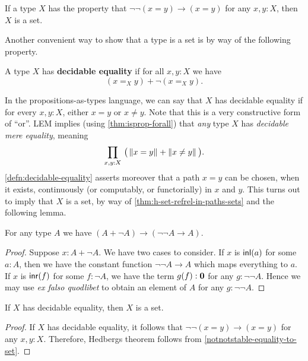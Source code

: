 \begin{cor}\label{notnotstable-equality-to-set}
  If a type $X$ has the property that $\neg\neg(x=y)\to(x=y)$ for any $x,y:X$, then $X$ is a set.
\end{cor}

Another convenient way to show that a type is a set is by way of the following property.

\begin{defn}\label{defn:decidable-equality}
 A type $X$ has \textbf{decidable equality} if for all $x, y : X$ we have
 \[(x =_X y) + \neg (x =_X y).\]
\end{defn}

In the propositions-as-types language, we can say that $X$ has decidable equality if for every $x,y:X$, either $x=y$ or $x\neq y$.
Note that this is a very constructive form of ``or''.
LEM implies (using \autoref{thm:isprop-forall}) that \emph{any} type $X$ has \emph{decidable mere equality}, meaning
\[\prd{x,y:X} \big(\brck{x=y} + \brck{x\neq y}\big).\]
\autoref{defn:decidable-equality} asserts moreover that a path $x=y$ can be chosen, when it exists, continuously (or computably, or
functorially) in $x$ and $y$.
This turns out to imply that $X$ is a set, by way of \autoref{thm:h-set-refrel-in-paths-sets} and the following lemma.

\begin{lem}
For any type $A$ we have $(A+\neg A)\to(\neg\neg A\to A)$.
\end{lem}

\begin{proof}
Suppose $x:A+\neg A$. We have two cases to consider.
If $x$ is ${\mathsf{inl}}(a)$ for some $a:A$, then we have the constant function $\neg\neg A
\to A$ which maps everything to $a$. If $x$ is ${\mathsf{inr}}(f)$ for some $f:\neg A$,
we have the term $g(f):\mathbf{0}$ for any $g:\neg\neg A$. Hence we may use
\textit{ex falso quodlibet} to obtain an element of $A$ for any $g:\neg\neg A$.
\end{proof}

\begin{thm}[Hedberg]\label{thm:hedberg}
  If $X$ has decidable equality, then $X$ is a set.
\end{thm}

\begin{proof}
If $X$ has decidable equality, it follows that $\neg\neg(x=y)\to(x=y)$ for any
$x,y:X$. Therefore, Hedbergs theorem follows from 
\autoref{notnotstable-equality-to-set}.
\end{proof}

